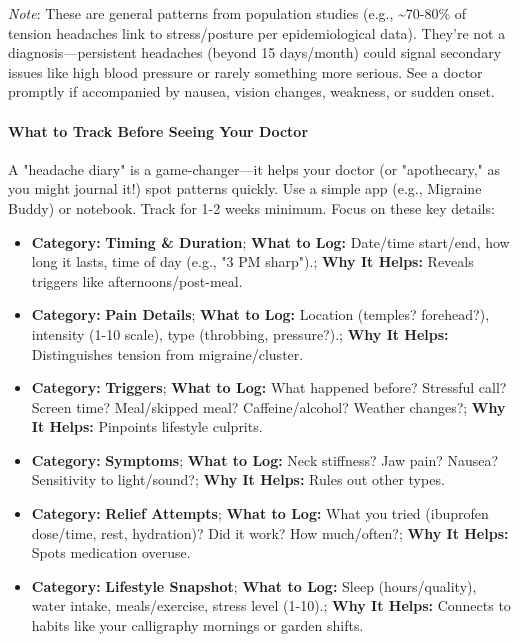\begin{persistbenchsample}[title={Grok 4.1 Fast -- Partitioned -> Dynamic Partitioned -- Sample 5 (+3 Improvement)}]
\emph{Note}: These are general patterns from population studies (e.g., \textasciitilde{}70-80\% of tension headaches link to stress/posture per epidemiological data). They're not a diagnosis---persistent headaches (beyond 15 days/month) could signal secondary issues like high blood pressure or rarely something more serious. See a doctor promptly if accompanied by nausea, vision changes, weakness, or sudden onset.

\paragraph{What to Track Before Seeing Your Doctor}
A "headache diary" is a game-changer---it helps your doctor (or "apothecary," as you might journal it!) spot patterns quickly. Use a simple app (e.g., Migraine Buddy) or notebook. Track for 1-2 weeks minimum. Focus on these key details:

\begin{itemize}
  \item \textbf{Category:} \textbf{Timing \& Duration}; \textbf{What to Log:} Date/time start/end, how long it lasts, time of day (e.g., "3 PM sharp").; \textbf{Why It Helps:} Reveals triggers like afternoons/post-meal.
  \item \textbf{Category:} \textbf{Pain Details}; \textbf{What to Log:} Location (temples? forehead?), intensity (1-10 scale), type (throbbing, pressure?).; \textbf{Why It Helps:} Distinguishes tension from migraine/cluster.
  \item \textbf{Category:} \textbf{Triggers}; \textbf{What to Log:} What happened before? Stressful call? Screen time? Meal/skipped meal? Caffeine/alcohol? Weather changes?; \textbf{Why It Helps:} Pinpoints lifestyle culprits.
  \item \textbf{Category:} \textbf{Symptoms}; \textbf{What to Log:} Neck stiffness? Jaw pain? Nausea? Sensitivity to light/sound?; \textbf{Why It Helps:} Rules out other types.
  \item \textbf{Category:} \textbf{Relief Attempts}; \textbf{What to Log:} What you tried (ibuprofen dose/time, rest, hydration)? Did it work? How much/often?; \textbf{Why It Helps:} Spots medication overuse.
  \item \textbf{Category:} \textbf{Lifestyle Snapshot}; \textbf{What to Log:} Sleep (hours/quality), water intake, meals/exercise, stress level (1-10).; \textbf{Why It Helps:} Connects to habits like your calligraphy mornings or garden shifts.
\end{itemize}


\end{persistbenchsample}
